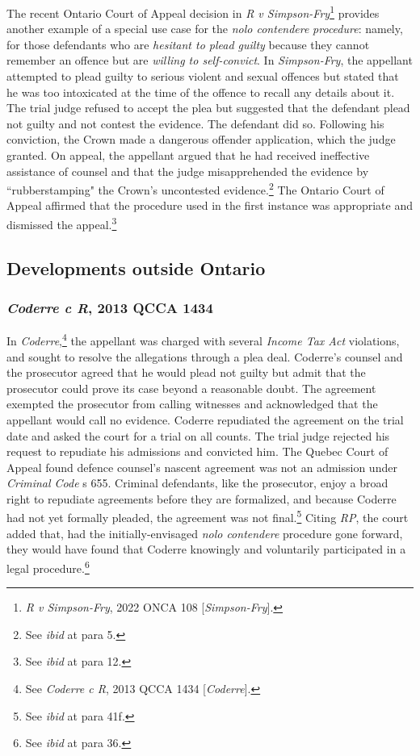The recent Ontario Court of Appeal decision in \textit{R v Simpson-Fry}\footnote{\textit{R v Simpson-Fry}, 2022 ONCA 108 [\textit{Simpson-Fry}].} provides another example of a special use case for the \textit{nolo contendere} \textit{procedure}: namely, for those defendants who are \textit{hesitant to plead guilty} because they cannot remember an offence but are \textit{willing to self-convict}. In \textit{Simpson-Fry}, the appellant attempted to plead guilty to serious violent and sexual offences but stated that he was too intoxicated at the time of the offence to recall any details about it. The trial judge refused to accept the plea but suggested that the defendant plead not guilty and not contest the evidence. The defendant did so. Following his conviction, the Crown made a dangerous offender application, which the judge granted. On appeal, the appellant argued that he had received ineffective assistance of counsel and that the judge misapprehended the evidence by ``rubberstamping" the Crown's uncontested evidence.\footnote{See \textit{ibid} at para 5.} The Ontario Court of Appeal affirmed that the procedure used in the first instance was appropriate and dismissed the appeal.\footnote{See \textit{ibid} at para 12.}

\subsection{Developments outside Ontario}
\subsubsection{\textit{Coderre c R}, 2013 QCCA 1434}
In \textit{Coderre},\footnote{See \textit{Coderre c R}, 2013 QCCA 1434 [\textit{Coderre}].} the appellant was charged with several \textit{Income Tax Act} violations, and sought to resolve the allegations through a plea deal. Coderre's counsel and the prosecutor agreed that he would plead not guilty but admit that the prosecutor could prove its case beyond a reasonable doubt. The agreement exempted the prosecutor from calling witnesses and acknowledged that the appellant would call no evidence. Coderre repudiated the agreement on the trial date and asked the court for a trial on all counts. The trial judge rejected his request to repudiate his admissions and convicted him. The Quebec Court of Appeal found defence counsel's nascent agreement was not an admission under \textit{Criminal Code} s 655. Criminal defendants, like the prosecutor, enjoy a broad right to repudiate agreements before they are formalized, and because Coderre had not yet formally pleaded, the agreement was not final.\footnote{See \textit{ibid} at para 41f.} Citing \textit{RP}, the court added that, had the initially-envisaged \textit{nolo contendere} procedure gone forward, they would have found that Coderre knowingly and voluntarily participated in a legal procedure.\footnote{See \textit{ibid} at para 36.}

